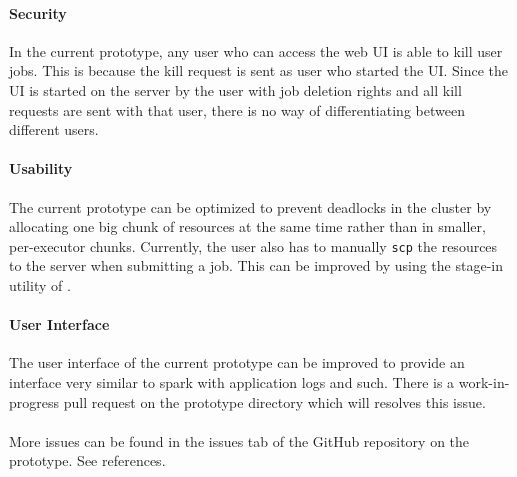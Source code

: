 \paragraph{Security} In the current prototype, any user who can access the web
UI is able to kill user jobs. This is because the kill request is sent as user
who started the UI. Since the UI is started on the server by the user with job
deletion rights and all kill requests are sent with that user, there is no way
of differentiating between different users.

\paragraph{Usability} The current prototype can be optimized to prevent
deadlocks in the cluster by allocating one big chunk of resources at the same
time rather than in smaller, per-executor chunks. Currently, the user also has
to manually \texttt{scp} the resources to the server when submitting a job. This
can be improved by using the stage-in utility of .

\paragraph{User Interface} The user interface of the current prototype can be
improved to provide an interface very similar to \gls{spark} with application
logs and such. There is a work-in-progress pull request on the prototype
directory which will resolves this issue.

\paragraph{} More issues can be found in the issues tab of the GitHub repository
on the prototype. See references.
